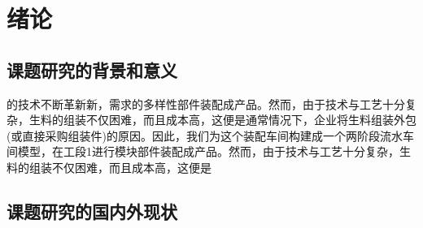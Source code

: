\chapter{绪论}
\section{课题研究的背景和意义}


{\wuhao 的技术不断革新}新，{\xiaowu 需求的多样性部件装配}成产品。然而，由于技术与工艺十分复杂，生料的组装不仅困难，而且成本高，这便是通常情况下，企业将生料组装外包(或直接采购组装件)的原因。因此，我们为这个装配车间构建成一个两阶段流水车间模型，在工段1进行模块部件装配成产品。然而，由于技术与工艺十分复杂，生料的组装不仅困难，而且成本高，这便是
\section{课题研究的国内外现状}